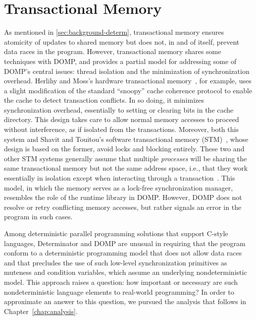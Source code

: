 \section{Transactional Memory}
As mentioned in \ref{sec:background-determ}, transactional memory ensures atomicity of updates to shared memory but does not, in and of itself, prevent data races in the program.  However, transactional memory shares some techniques with DOMP, and provides a partial model for addressing some of DOMP's central issues:  thread isolation and the minimization of synchronization overhead.  Herlihy and Moss's hardware transactional memory~\cite{herlihy93tm}, for example, uses a slight modification of the standard ``snoopy'' cache coherence protocol to enable the cache to detect transaction conflicts.  In so doing, it minimizes synchronization overhead, essentially to setting or clearing bits in the cache directory.  This design takes care to allow normal memory accesses to proceed without interference, as if isolated from the transactions.  Moreover, both this system and Shavit and Touitou's software transactional memory (STM)~\cite{shavit97software}, whose design is based on the former, avoid locks and blocking entirely.  These two and other STM systems generally assume that multiple \textit{processes} will be sharing the same transactional memory but not the same address space, i.e., that they work essentially in isolation except when interacting through a transaction~\cite{dolev08carSTM, herlihy03stm, harris10tm}.  This model, in which the memory serves as a lock-free synchronization manager, resembles the role of the runtime library in DOMP.  However, DOMP does not resolve or retry conflicting memory accesses, but rather signals an error in the program in such cases.  

\parasep

Among deterministic parallel programming solutions that support C-style languages, Determinator and DOMP are unusual in requiring that the program conform to a deterministic programming model that does not allow data races and that precludes the use of such low-level synchronization primitives as muteness and condition variables, which assume an underlying nondeterministic model.  This approach raises a question:  how important or necessary are such nondeterministic language elements to real-world programming?  In order to approximate an answer to this question, we pursued the analysis that follows in Chapter~\ref{chap:analysis}.
